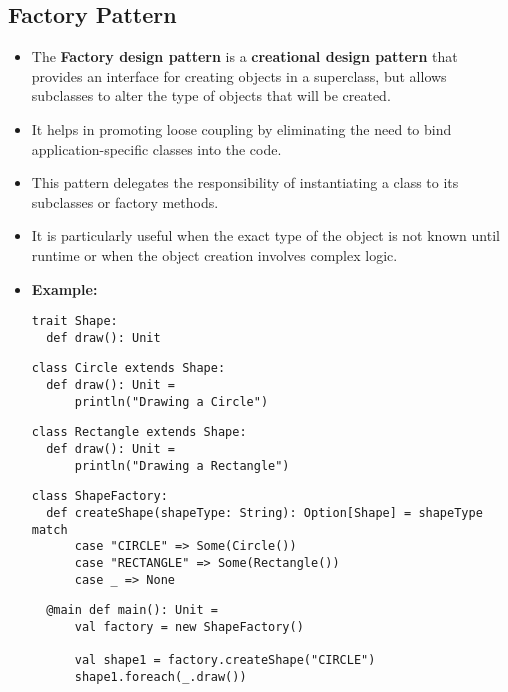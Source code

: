 \documentclass{article}
\begin{document}
\subsection{Factory Pattern}
\begin{itemize}
    \item The \textbf{Factory design pattern} is a \textbf{creational design pattern} that provides an interface for creating objects in a superclass, but allows subclasses to alter the type of objects that will be created.
    \item It helps in promoting loose coupling by eliminating the need to bind application-specific classes into the code.
    \item This pattern delegates the responsibility of instantiating a class to its subclasses or factory methods.
    \item It is particularly useful when the exact type of the object is not known until runtime or when the object creation involves complex logic.
    \item \textbf{Example:}
          \begin{verbatim}
trait Shape:
  def draw(): Unit
          \end{verbatim}
          \begin{verbatim}
class Circle extends Shape:
  def draw(): Unit =
      println("Drawing a Circle")
          \end{verbatim}
          \begin{verbatim}
class Rectangle extends Shape:
  def draw(): Unit =
      println("Drawing a Rectangle")
          \end{verbatim}
          \begin{verbatim}
class ShapeFactory:
  def createShape(shapeType: String): Option[Shape] = shapeType match
      case "CIRCLE" => Some(Circle())
      case "RECTANGLE" => Some(Rectangle())
      case _ => None
          \end{verbatim}
          \begin{verbatim}
  @main def main(): Unit =
      val factory = new ShapeFactory()

      val shape1 = factory.createShape("CIRCLE")
      shape1.foreach(_.draw())


\end{verbatim}
\end{itemize}
\end{document}
